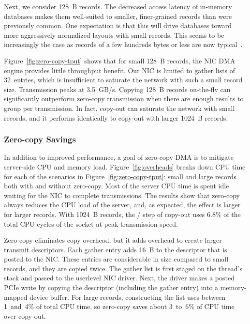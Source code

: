 Next, we consider 128~B records. The decreased access latency of
in-memory databases makes them well-suited to smaller, finer-grained records
than were previously common. One expectation is that this will drive databases
toward more aggressively normalized layouts with small records. This
seems to be increasingly the case as records of a few hundreds bytes or less
are now typical~\cite{fb-memcache,fb-workload}.

Figure~\ref{fig:zero-copy-tput} shows that for small 128~B records, the NIC DMA
engine provides little throughput benefit. Our NIC is limited to gather lists
of 32~entries, which is insufficient to saturate the network with such a small
record size. Transmission peaks at 3.5~GB/s.
Copying 128~B records on-the-fly can significantly outperform
zero-copy transmission when there are enough results to group per transmission.
In fact, copy-out can saturate the network with small records, and it
performs identically to copy-out with larger 1024~B records.

\subsubsection{Zero-copy Savings}
\label{sec:overhead}


In addition to improved performance, a goal of zero-copy DMA is to mitigate
server-side CPU and memory load. Figure~\ref{fig:overheads} breaks down
CPU time for each of the scenarios in Figure~\ref{fig:zero-copy-tput}: small
and large records both with and without zero-copy. Most of the server
CPU time is spent idle waiting for the NIC to complete transmissions.  The
results show that zero-copy always reduces the CPU load of the server, and,
as expected, the effect is larger for larger records. With 1024~B records,
the \memcpy/  step of copy-out uses 6.8\% of the total CPU cycles of the
socket at peak transmission speed.

Zero-copy eliminates copy overhead, but it adds overhead to create
larger transmit descriptors.  Each gather entry adds
16~B to the descriptor that is posted to the NIC.
These entries are considerable in size compared to
small records, and they are copied twice. The gather list
is first staged on the thread's stack and passed to the userlevel NIC driver. Next,
the driver makes a posted PCIe write by copying the descriptor (including the
gather entry) into a memory-mapped device buffer.  For large records,
constructing the list uses between 1~and~4\% of total CPU time, so zero-copy
saves about 3~to~6\% of CPU time over copy-out.

